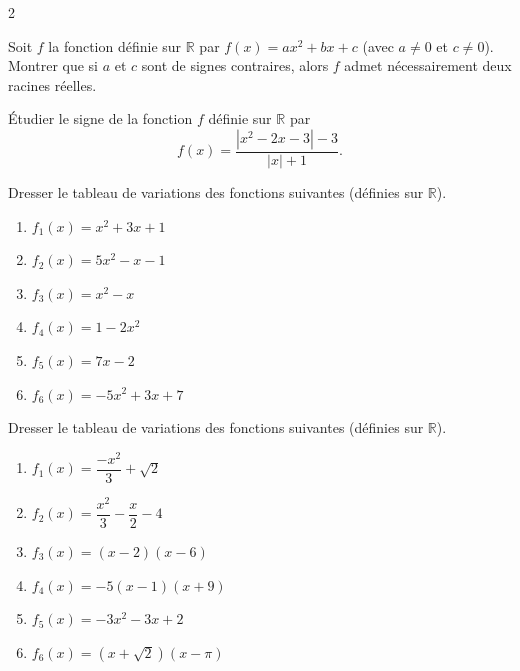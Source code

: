 \documentclass[a4paper,12pt]{article}
\begin{document}
\begin{multicols}{2}
\begin{exercice}[title=Exercice 17 \quad$\star\star$\quad\ {Raisonner, Communiquer}]{}{}
Soit \(f\) la fonction définie sur \( \mathbb{R} \) par \( f(x) = ax^2 + bx + c \) (avec \( a \neq 0 \) et \( c \neq 0 \)). Montrer que si \(a\) et \(c\) sont de signes contraires, alors \(f\) admet nécessairement deux racines réelles.
\end{exercice}

\begin{exercice}[title=Exercice 18 \quad$\star\star\star$\quad\ {[Calculer, Chercher]}]{}{}
Étudier le signe de la fonction \( f \) définie sur \( \mathbb{R} \) par
\[
f(x) = \dfrac{|x^2 - 2x - 3| - 3}{|x| + 1}.
\]
\end{exercice}

\begin{exercice}[title=Exercice 19 \quad$\star$\quad\  {[Calculer]}]{}{}
Dresser le tableau de variations des fonctions suivantes (définies sur \( \mathbb{R} \)).
\begin{enumerate}
    \item \( f_1(x) = x^2 + 3x + 1 \)
    \item \( f_2(x) = 5x^2 - x - 1 \)
    \item \( f_3(x) = x^2 - x \)
    \item \( f_4(x) = 1 - 2x^2 \)
    \item \( f_5(x) = 7x - 2 \)
    \item \( f_6(x) = -5x^2 + 3x + 7 \)
\end{enumerate}
\end{exercice}

\begin{exercice}[title=Exercice 20 \quad$\star\star$\quad\  {[Calculer]}]{}{}
Dresser le tableau de variations des fonctions suivantes (définies sur \( \mathbb{R} \)).
\begin{enumerate}
    \item \( f_1(x) = \dfrac{-x^2}{3} + \sqrt{2} \)
    \item \( f_2(x) = \dfrac{x^2}{3} - \dfrac{x}{2} - 4 \)
    \item \( f_3(x) = (x - 2)(x - 6) \)
    \item \( f_4(x) = -5(x - 1)(x + 9) \)
    \item \( f_5(x) = -3x^2 - 3x + 2 \)
    \item \( f_6(x) = (x + \sqrt{2})(x - \pi) \)
\end{enumerate}
\end{exercice}


\end{multicols}
\end{document}
